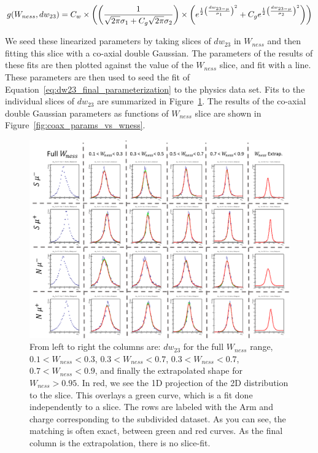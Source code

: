 \begin{equation}
  g(W_{ness},dw_{23}) = C_w \times 
  \left(
    \left( 
      { {1}\over{\sqrt{2\pi}\sigma_1+C_g\sqrt{2\pi}\sigma_2} }
    \right) 
    \times
    \left(
      e^{{{1}\over{2}}{\left({dw_{23-\mu}}\over{\sigma_1}\right)^2}}
        +C_ge^{{{1}\over{2}}{\left({dw_{23-\mu}}\over{\sigma_2}\right)^2}} 
    \right) 
  \right)
  \label{eq:dw23_parameterization}
\end{equation}

We seed these linearized parameters by taking slices of $dw_{23}$ in $W_{ness}$
and then fitting this slice with a co-axial double Gaussian. The parameters of
the results of these fits are then plotted against the value of the $W_{ness}$
slice, and fit with a line. These parameters are then used to seed the fit of
Equation~\ref{eq:dw23_final_parameterization} to the physics data set. Fits to
the individual slices of $dw_{23}$ are summarized in
Figure~\ref{fig:dw23_slice_fits}. The results of the co-axial double Gaussian
parameters as functions of $W_{ness}$ slice are shown in
Figure~\ref{fig:coax_params_vs_wness}.

\begin{figure}
  \centering
  \includegraphics[width=\linewidth]{./figures/dw23_extrap_bins.png}
  \caption{
    From left to right the columns are: $dw_{23}$ for the full $W_{ness}$ range,
    $0.1 < W_{ness} < 0.3$, $0.3 < W_{ness} < 0.7$, $0.3 < W_{ness} < 0.7$, 
    $0.7 < W_{ness} < 0.9$, and finally the extrapolated shape for $W_{ness} >
    0.95$. In red, we see the 1D projection of the 2D distribution to the slice.
    This overlays a green curve, which is a fit done independently to a slice.
    The rows are labeled with the Arm and charge corresponding to the subdivided
    dataset. As you can see, the matching is often exact, between green and red
    curves. As the final column is the extrapolation, there is no slice-fit.
  }
  \label{fig:dw23_slice_fits}
\end{figure}

